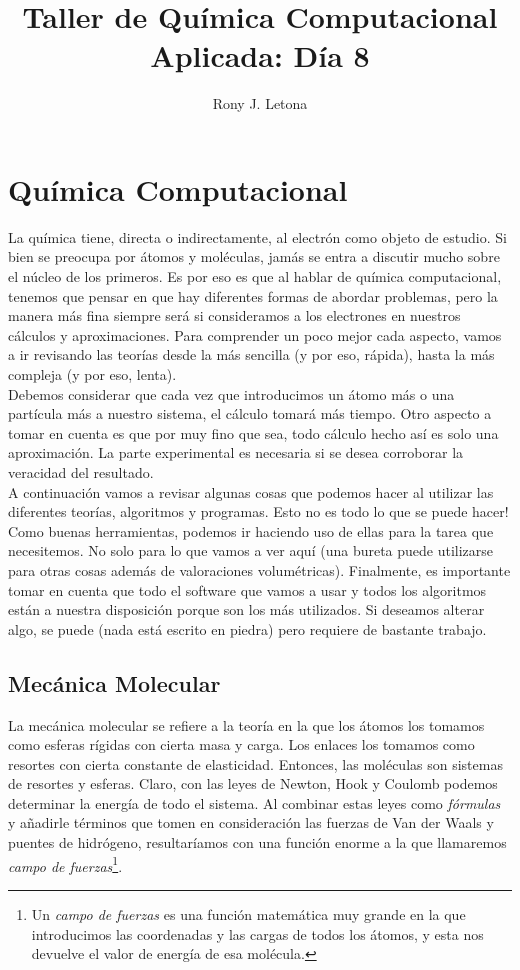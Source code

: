 \documentclass[10pt,letterpaper]{article}
\author{Rony J. Letona}
\title{Taller de Qu\'imica Computacional Aplicada: D\'ia 8}
\begin{document}
\maketitle

\section{Qu\'imica Computacional}
La qu\'imica tiene, directa o indirectamente, al electr\'on como objeto de estudio. Si bien se preocupa por \'atomos y mol\'eculas, jam\'as se entra a discutir mucho sobre el n\'ucleo de los primeros. Es por eso es que al hablar de qu\'imica computacional, tenemos que pensar en que hay diferentes formas de abordar problemas, pero la manera m\'as fina siempre ser\'a si consideramos a los electrones en nuestros c\'alculos y aproximaciones. Para comprender un poco mejor cada aspecto, vamos a ir revisando las teor\'ias desde la m\'as sencilla (y por eso, r\'apida), hasta la m\'as compleja (y por eso, lenta).\\

Debemos considerar que cada vez que introducimos un \'atomo m\'as o una part\'icula m\'as a nuestro sistema, el c\'alculo tomar\'a m\'as tiempo. Otro aspecto a tomar en cuenta es que por muy fino que sea, todo c\'alculo hecho as\'i es solo una aproximaci\'on. La parte experimental es necesaria si se desea corroborar la veracidad del resultado.\\

A continuaci\'on vamos a revisar algunas cosas que podemos hacer al utilizar las diferentes teor\'ias, algoritmos y programas. Esto no es todo lo que se puede hacer! Como buenas herramientas, podemos ir haciendo uso de ellas para la tarea que necesitemos. No solo para lo que vamos a ver aqu\'i (una bureta puede utilizarse para otras cosas adem\'as de valoraciones volum\'etricas). Finalmente, es importante tomar en cuenta que todo el software que vamos a usar y todos los algoritmos est\'an a nuestra disposici\'on porque son los m\'as utilizados. Si deseamos alterar algo, se puede (nada est\'a escrito en piedra) pero requiere de bastante trabajo.

\subsection{Mec\'anica Molecular}
La mec\'anica molecular se refiere a la teor\'ia en la que los \'atomos los tomamos como esferas r\'igidas con cierta masa y carga. Los enlaces los tomamos como resortes con cierta constante de elasticidad. Entonces, las mol\'eculas son sistemas de resortes y esferas. Claro, con las leyes de Newton, Hook y Coulomb podemos determinar la energ\'ia de todo el sistema. Al combinar estas leyes como \emph{f\'ormulas} y a\~nadirle t\'erminos que tomen en consideraci\'on las fuerzas de Van der Waals y puentes de hidr\'ogeno, resultar\'iamos con una funci\'on enorme a la que llamaremos \emph{campo de fuerzas}\footnote{Un \emph{campo de fuerzas} es una funci\'on matem\'atica muy grande en la que introducimos las coordenadas y las cargas de todos los \'atomos, y esta nos devuelve el valor de energ\'ia de esa mol\'ecula.}.\\
\end{document}
